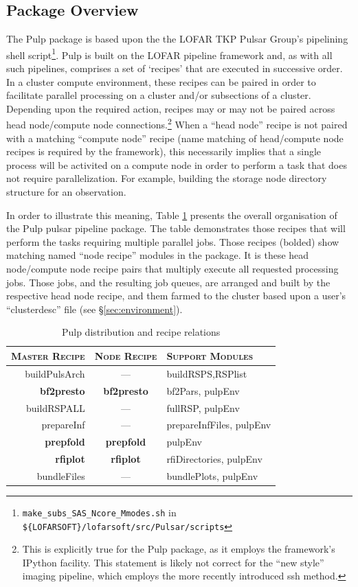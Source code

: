 \documentclass[a4paper,10pt,bibtotoc]{scrartcl}
\begin{document}
\subsection{Package Overview}
\label{sec:package}
The Pulp package is based upon the the LOFAR TKP Pulsar Group's pipelining shell 
script\footnote{ \texttt{make\_subs\_SAS\_Ncore\_Mmodes.sh} in
\texttt{ \$\{LOFARSOFT\}/lofarsoft/src/Pulsar/scripts}}.  Pulp is 
built on the LOFAR pipeline framework and, as with all such pipelines, 
comprises a set of `recipes' that are executed in successive order.  
In a cluster compute environment, these recipes can be paired in order 
to facilitate parallel processing on a cluster and/or subsections of a 
cluster. Depending upon the required action, recipes may or may not be 
paired across head node/compute node connections.\footnote{This is
  explicitly true for the Pulp package, as it employs the framework's IPython
  facility.  This statement is likely not correct for the ``new
  style'' imaging pipeline, which employs the more recently introduced
  ssh method.}  When a ``head node'' 
recipe is not paired with a matching ``compute node'' recipe (name
matching of head/compute node recipes is required by the framework),
this necessarily implies that a single process will be activited on a
compute node in order to perform a task that does not require
parallelization. For example, building the storage node directory
structure for an observation.

In order to illustrate this meaning, Table \ref{tab:recipeTable} presents 
the overall organisation of the Pulp pulsar pipeline package.  The table 
demonstrates those recipes that will perform the tasks requiring multiple 
parallel jobs.  Those recipes (bolded) show matching named ``node recipe'' 
modules in the package.  It is these head node/compute node recipe pairs that 
multiply execute all requested processing jobs.  Those jobs, and the resulting 
job queues, are arranged and built by the respective head node recipe, and 
them farmed to the cluster based upon a user's ``clusterdesc'' 
file (see \S \ref{sec:environment}).

\begin{table}[ht]
\centering
\begin{tabular}{|r|c|l|}
\hline
\textsc{Master Recipe} &\textsc{Node Recipe}&\textsc{Support Modules}\\
\hline \hline
buildPulsArch & --- & buildRSPS,RSPlist\\
\hline
    \textbf{bf2presto} & \textbf{bf2presto} & bf2Pars, pulpEnv\\
\hline
  buildRSPALL &    ---    & fullRSP, pulpEnv\\
\cline{1-2}
   prepareInf &    ---    & prepareInfFiles, pulpEnv\\
\hline
    \textbf{prepfold} & \textbf{prepfold}  & pulpEnv\\
\hline
      \textbf{rfiplot} &\textbf{rfiplot}   & rfiDirectories, pulpEnv\\
\hline
bundleFiles &    ---    & bundlePlots, pulpEnv\\
\hline
\end{tabular}
  \caption{Pulp distribution and recipe relations}
  \label{tab:recipeTable}
\end{table}
\end{document}

